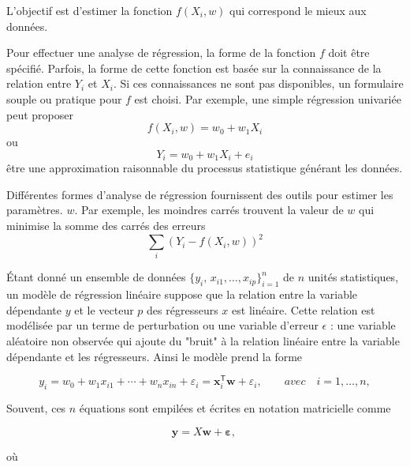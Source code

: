 		L'objectif est d'estimer la fonction ${\displaystyle f(X_{i},w )}$ qui correspond le mieux aux données.
		
		Pour effectuer une analyse de régression, la forme de la fonction $f$ doit être spécifié. Parfois, la forme de cette fonction est basée sur la connaissance de la relation entre $Y_{i}$ et $X_{i}$. 
		Si ces connaissances ne sont pas disponibles, un formulaire souple ou pratique pour $f$ est choisi. Par exemple, une simple régression univariée peut proposer
		 $${\displaystyle f(X_{i},w )= w_{0}+ w_{1}X_{i}}$$
		ou
		 $${\displaystyle Y_{i}= w_{0}+ w_{1}X_{i}+e_{i}}$$
		être une approximation raisonnable du processus statistique générant les données.
		 
		 Différentes formes d'analyse de régression fournissent des outils pour estimer les paramètres. $w$. Par exemple, les moindres carrés trouvent la valeur de $w$ qui minimise la somme des carrés des erreurs \cite{deepa2021ai} $${\sum _{i}(Y_{i}-f(X_{i},w ))^{2}}$$ 
		 
		 Étant donné un ensemble de données ${\displaystyle \{y_{i},\,x_{i1},\ldots ,x_{ip}\}_{i=1}^{n}}$ de $n$ unités statistiques, un modèle de régression linéaire suppose que la relation entre la variable dépendante $y$ et le vecteur $p$ des régresseurs $x$ est linéaire. Cette relation est modélisée par un terme de perturbation ou une variable d'erreur $\epsilon$ : une variable aléatoire non observée qui ajoute du "bruit" à la relation linéaire entre la variable dépendante et les régresseurs. Ainsi le modèle prend la forme
		 
		$${\displaystyle y_{i}=w _{0}+w _{1}x_{i1}+\cdots +w _{n}x_{in}+\varepsilon _{i}=\mathbf { x} _{i}^{\mathsf {T}}{\boldsymbol {w }}+\varepsilon_{i},\qquad avec \quad i=1,\ldots ,n,}
		$$
		
		Souvent, ces $n$ équations sont empilées et écrites en notation matricielle comme
		
		$$
		{\displaystyle \mathbf {y} =X{\boldsymbol {w}}+{\boldsymbol {\varepsilon}},\,}
		$$
		
		où
		
